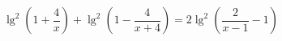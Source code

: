 \begin{ex}[type=equation]
	\begin{condition}
		$\lg^2 \left(1 + \dfrac{4}{x}\right) + \lg^2 \left(1 - \dfrac{4}{x + 4}\right) = 2\lg^2\left(\dfrac{2}{x - 1} - 1\right)$
	\end{condition}
\end{ex}